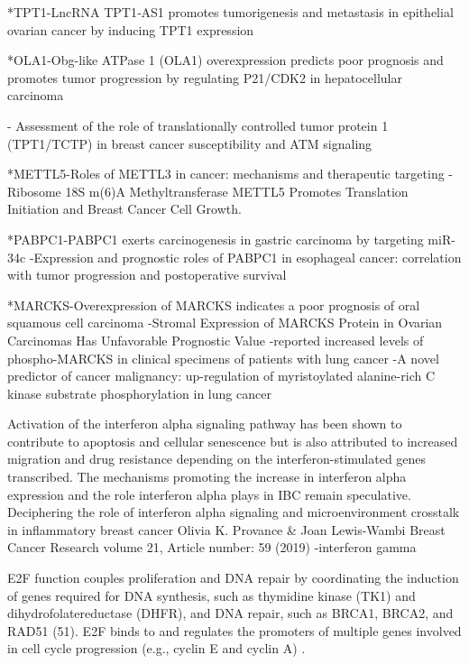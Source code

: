 *TPT1-LncRNA TPT1‐AS1 promotes tumorigenesis and metastasis in epithelial ovarian cancer by inducing TPT1 expression

*OLA1-Obg-like ATPase 1 (OLA1) overexpression predicts poor prognosis and promotes tumor progression by regulating P21/CDK2 in hepatocellular carcinoma

- Assessment of the role of translationally controlled tumor protein 1 (TPT1/TCTP) in breast cancer susceptibility and ATM signaling

*METTL5-Roles of METTL3 in cancer: mechanisms and therapeutic targeting
- Ribosome 18S m(6)A Methyltransferase METTL5 Promotes Translation Initiation and Breast Cancer Cell Growth.

*PABPC1-PABPC1 exerts carcinogenesis in gastric carcinoma by targeting miR-34c
-Expression and prognostic roles of PABPC1 in esophageal cancer: correlation with tumor progression and postoperative survival

*MARCKS-Overexpression of MARCKS indicates a poor prognosis of oral squamous cell carcinoma
-Stromal Expression of MARCKS Protein in Ovarian
Carcinomas Has Unfavorable Prognostic Value
-reported increased levels of phospho-MARCKS in clinical specimens of patients with lung cancer
-A novel predictor of cancer malignancy: up-regulation of myristoylated alanine-rich C kinase substrate phosphorylation in lung cancer

Activation of the interferon alpha signaling pathway has been shown to contribute to apoptosis and cellular senescence but is also attributed to increased migration and drug resistance depending on the interferon-stimulated genes transcribed. The mechanisms promoting the increase in interferon alpha expression and the role interferon alpha plays in IBC remain speculative. Deciphering the role of interferon alpha signaling and microenvironment crosstalk in inflammatory breast cancer
Olivia K. Provance & Joan Lewis-Wambi 
Breast Cancer Research volume 21, Article number: 59 (2019) 
\cite{provance2019deciphering}
\cite{mojic2018dark}-interferon gamma

E2F function couples proliferation and DNA repair by coordinating the induction of genes required for DNA synthesis, such as thymidine kinase (TK1) and dihydrofolatereductase (DHFR), and DNA repair, such as BRCA1, BRCA2, and RAD51 (51).
E2F binds to and regulates the promoters of multiple genes involved in cell cycle progression (e.g., cyclin E and cyclin A) \cite{wiedemeyer2014reversing, knudsen2010targeting}.

